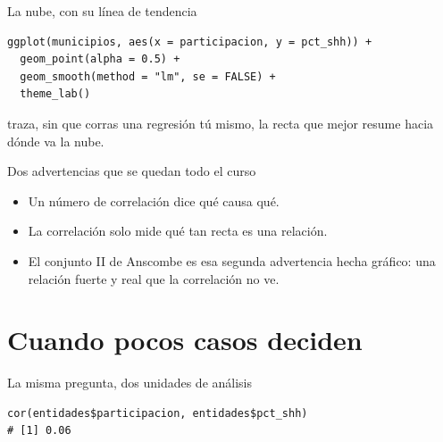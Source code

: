 \begin{frame}[fragile]{La nube, con su línea de tendencia}
\begin{lstlisting}
ggplot(municipios, aes(x = participacion, y = pct_shh)) +
  geom_point(alpha = 0.5) +
  geom_smooth(method = "lm", se = FALSE) +
  theme_lab()
\end{lstlisting}

  \vspace{0.5em}
  {\small{} traza, sin que corras una regresión tú
  mismo, la recta que mejor resume hacia dónde va la nube.}
\end{frame}

\begin{frame}{Dos advertencias que se quedan todo el curso}
  \vspace{0.3em}
  \begin{itemize}\setlength{\itemsep}{0.9em}
    \item<1-> Un número de correlación  dice qué causa qué.
    \item<2-> La correlación solo mide qué tan \ac{recta} es una relación.
    \item<3-> El conjunto II de Anscombe es esa segunda advertencia hecha
          gráfico: una relación fuerte y real que la correlación no ve.
  \end{itemize}
\end{frame}

\section{Cuando pocos casos deciden}

\begin{frame}[fragile]{La misma pregunta, dos unidades de análisis}
\begin{lstlisting}
cor(entidades$participacion, entidades$pct_shh)
# [1] 0.06
\end{lstlisting}

  \vspace{0.6em}
\end{frame}

